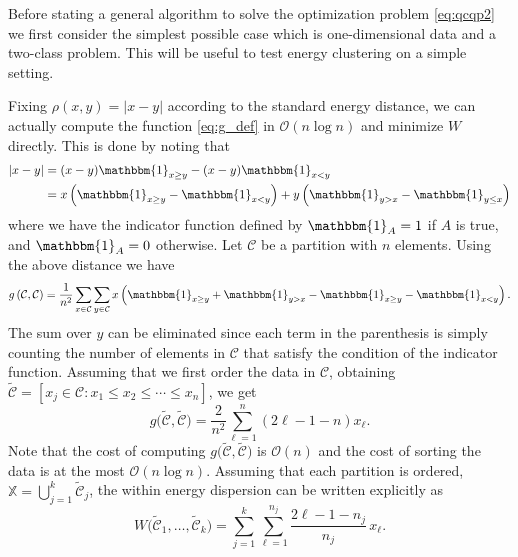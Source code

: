 \documentclass[aps,preprint,nofootinbib,floatfix]{revtex4-1}
\newcommand\C{{\mathcal{C}}}
\newcommand\tC{{\widetilde{\C}}}
\newcommand\OO{{\mathcal{O}}}
\newcommand{\Ind}[1]{\mathbbm{1}_{#1}}
\begin{document}

Before stating a general algorithm to solve the optimization problem
\eqref{eq:qcqp2}
we first consider the simplest possible case which
is one-dimensional data and a two-class problem. This will be useful to test
energy clustering on a simple setting.

Fixing
$\rho(x,y) = |x - y|$ according to the standard energy distance, we can 
actually compute the function
\eqref{eq:g_def} in $\OO(n \log n)$ and minimize
$W$ directly.
This is done by noting that
\begin{equation}
\begin{aligned}
|x - y|  &= (x-y)\Ind{x \ge y} -
(x-y) \Ind{x < y}  \\
&= 
x \left( \Ind{x \ge y} - \Ind{x < y} \right)  + 
y \left( \Ind{y > x} - \Ind{y \le x} \right)  
\end{aligned}
\end{equation}
where we have the indicator function defined by 
$\Ind{A}=1$ if $A$ is true, and $\Ind{A}=0$ otherwise. 
Let $\C$ be a partition with
$n$ elements. Using the above distance we have
\begin{equation}
\label{eq:g_ind}
g\left(\C,\C\right) = \dfrac{1}{n^2} \sum_{x \in \C} 
\sum_{y \in \C} 
x \left(
\Ind{x \ge y} + \Ind{y > x} - 
\Ind{x \ge y}-\Ind{x < y} \right) .
\end{equation}
The sum over $y$ can be eliminated since each term in
the parenthesis is simply counting the number of elements in $\C$ that satisfy
the condition of the indicator function. Assuming
that we first order the data in $\C$, obtaining
$\tC = [ x_j \in \C: x_1 \le x_2 \le \dotsm \le x_{n}]$, we
get 
\begin{equation}
\label{eq:g1d}
g\big(\tC, \tC \big) = 
\dfrac{2}{n^2} \sum_{\ell=1}^n (2\ell - 1 - n) x_\ell .
\end{equation}
Note that the cost of computing 
$g\big( \tC, \tC \big)$
is $\OO(n)$ and the cost of
sorting the data
is at the most $\OO(n\log n)$.
Assuming that each partition is ordered,  
$\mathbb{X} = \bigcup_{j=1}^k \tC_j$,
the within energy dispersion
can be written explicitly as
\begin{equation}
\label{eq:w1d}
W\big( \tC_1,\dotsc,\tC_k \big) = 
\sum_{j=1}^k \sum_{\ell=1}^{n_j} \dfrac{2\ell - 1 - n_j}{n_j} \, x_\ell.
\end{equation}
\end{document}
